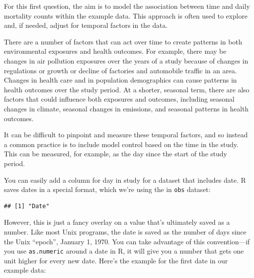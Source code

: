 \documentclass[
]{book}
\newenvironment{Shaded}{\begin{snugshade}}{\end{snugshade}}
\newcommand{\DecValTok}[1]{\textcolor[rgb]{0.00,0.00,0.81}{#1}}
\newcommand{\FunctionTok}[1]{\textcolor[rgb]{0.13,0.29,0.53}{\textbf{#1}}}
\newcommand{\NormalTok}[1]{#1}
\newcommand{\SpecialCharTok}[1]{\textcolor[rgb]{0.81,0.36,0.00}{\textbf{#1}}}
\begin{document}
For this first question, the aim is to model the association between time and
daily mortality counts within the example data. This approach is often used
to explore and, if needed, adjust for temporal factors in the data.

There are a number of factors that can act over time to create patterns in both
environmental exposures and health outcomes. For example, there may be changes
in air pollution exposures over the years of a study because of changes in
regulations or growth or decline of factories and automobile traffic in an area.
Changes in health care and in population demographics can cause patterns in
health outcomes over the study period. At a shorter, seasonal term, there are
also factors that could influence both exposures and outcomes, including
seasonal changes in climate, seasonal changes in emissions, and seasonal
patterns in health outcomes.

It can be difficult to pinpoint and measure these temporal factors, and so
instead a common practice is to include model control based on the time in the
study. This can be measured, for example, as the day since the start of the
study period.

You can easily add a column for day in study for a dataset that
includes date. R saves dates in a special format, which we're using the in
\texttt{obs} dataset:

\begin{Shaded}
\end{Shaded}

\begin{verbatim}
## [1] "Date"
\end{verbatim}

However, this is just a fancy overlay on a value that's ultimately saved as
a number. Like most Unix programs, the date is saved as the number of days
since the Unix ``epoch'', January 1, 1970. You can take advantage of this
convention---if you use \texttt{as.numeric} around a date in R, it will give you a
number that gets one unit higher for every new date. Here's the example for
the first date in our example data:

\begin{Shaded}
\end{Shaded}
\end{document}
